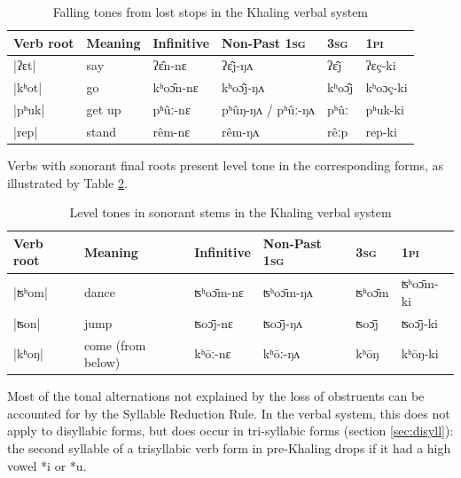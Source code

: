 \documentclass[oldfontcommands,oneside,a4paper,11pt]{article}
\newcommand{\ipa}[1]{{\phon \mbox{#1}}} %
\begin{document}
\begin{table}[h]
\caption{Falling tones from lost stops in the Khaling verbal system} \centering \label{tab:falling.verb}
\begin{tabular}{llllll}
\toprule
Verb root	&Meaning	&Infinitive  & Non-Past \textsc{1sg} &  \textsc{3sg} &  \textsc{1pi}\\
\midrule
|\ipa{ʔɛt}|	&	say			&\ipa{ʔɛ̂n-nɛ}		&\ipa{ʔɛ̂j-ŋʌ}	&\ipa{ʔɛ̂j} &\ipa{ʔɛç-ki} \\
|\ipa{kʰot}|	&	go		&\ipa{kʰoɔ̂n-nɛ}		&\ipa{kʰoɔ̂j-ŋʌ}&\ipa{kʰoɔ̂j} &\ipa{kʰoɔç-ki} \\
|\ipa{pʰuk}|	&	get up			&\ipa{pʰûː-nɛ}&\ipa{pʰûŋ-ŋʌ} / \ipa{pʰûː-ŋʌ}	&\ipa{pʰûː} &\ipa{pʰuk-ki} \\
|\ipa{rep}|	&	stand		&\ipa{rêm-nɛ}		&\ipa{rêm-ŋʌ}&\ipa{rêːp} &\ipa{rep-ki} \\
\bottomrule
\end{tabular}
\end{table}

Verbs with sonorant final roots present level tone in the corresponding forms, as illustrated by Table \ref{tab:level.verb}.


\begin{table}[h]
\caption{Level tones in sonorant stems in the Khaling verbal system} \centering \label{tab:level.verb}
\begin{tabular}{llllll}
\toprule
Verb root	&Meaning	&Infinitive  & Non-Past \textsc{1sg} &  \textsc{3sg} &  \textsc{1pi}\\
\midrule
|\ipa{ʦʰom}|	&	dance		&\ipa{ʦʰoɔ̄m-nɛ}		&\ipa{ʦʰoɔ̄m-ŋʌ}&\ipa{ʦʰoɔ̄m} &\ipa{ʦʰoɔ̄m-ki} \\
|\ipa{ʦon}|	&	jump		&\ipa{ʦoɔ̄j-nɛ}		&\ipa{ʦoɔ̄j-ŋʌ}&\ipa{ʦoɔ̄j} &\ipa{ʦoɔ̄j-ki} \\
|\ipa{kʰoŋ}|	&	come (from below)		&\ipa{kʰōː-nɛ}		&\ipa{kʰōː-ŋʌ}&\ipa{kʰōŋ} &\ipa{kʰōŋ-ki} \\
\bottomrule
\end{tabular}
\end{table}



Most of the tonal alternations not explained by the loss of obstruents can be accounted for by the  Syllable Reduction Rule. In the verbal system, this does not apply to disyllabic forms, but does  occur in tri-syllabic forms (section \ref{sec:disyll}): the second syllable of a trisyllabic verb form in pre-Khaling drops if it had a high vowel \ipa{*i} or \ipa{*u}.
\end{document}
